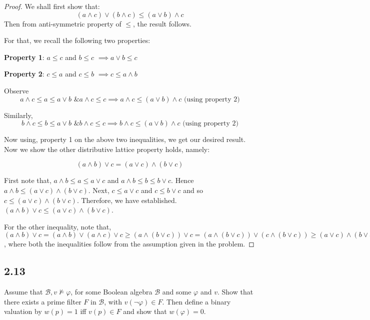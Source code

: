 \documentclass[12pt]{article}
\begin{document}
\begin{proof}
We shall first show that:
$$(a \wedge c) \vee (b \wedge c) \leq (a \vee b) \wedge c$$ 
Then from anti-symmetric property of $\leq$, the result follows.

For that, we recall the following two properties:

\textbf{Property 1}: $a \leq c$ and $b \leq c$ $\implies a \vee b \leq c$

\textbf{Property 2}: $c \leq a$ and $c \leq b$ $\implies c \leq a \wedge b$

Observe 
$$a \wedge c \leq a \leq a \vee b \text{ \& } a \wedge c \leq c \implies a \wedge c \leq (a \vee b) \wedge c \text{ (using property 2)}$$

Similarly,
$$b \wedge c \leq b \leq a \vee b \text{ \& } b \wedge c \leq c \implies b \wedge c \leq (a \vee b) \wedge c \text{ (using property 2)}$$

Now using, property 1 on the above two inequalities, we get our desired result. \\

Now we show the other distributive lattice property holds, namely:

$$(a \wedge b) \vee c = (a \vee c) \wedge (b \vee c)$$

First note that, $a \wedge b \leq a \leq a \vee c$ and $a \wedge b \leq b \leq b \vee c$. Hence $a \wedge b \leq (a \vee c) \wedge (b \vee c)$. Next, $c \leq a \vee c$ and $c \leq b \vee c$ and so $c \leq (a \vee c) \wedge (b \vee c)$. Therefore, we have established. $(a \wedge b) \vee c \leq (a \vee c) \wedge (b \vee c)$.

For the other inequality, note that, $(a \wedge b) \vee c = (a \wedge b) \vee (a \wedge c) \vee c \geq (a \wedge (b \vee c)) \vee c = (a \wedge (b \vee c)) \vee (c \wedge (b \vee c)) \geq (a \vee c) \wedge (b \vee c)$, where both the inequalities follow from the assumption given in the problem.

\end{proof}

\subsection*{2.13}
Assume that $\mathcal{B}, v \not \vDash \varphi$, for some Boolean algebra $\mathcal{B}$ and some $\varphi$ and $v$. Show that there exists a prime filter $F$ in $\mathcal{B}$, with $v(\neg \varphi) \in F$. Then define a binary valuation by $w(p) = 1$ iff $v(p) \in F$ and show that $w(\varphi) = 0$. \\
\end{document}
